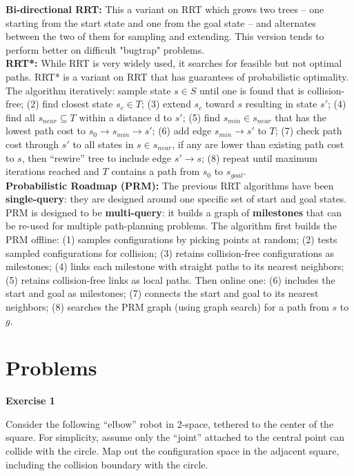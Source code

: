 \documentclass[11pt]{article}
\begin{document}
{\bf{Bi-directional RRT:}} This a variant on RRT which grows two trees -- one starting from the start state and one from the goal state -- and alternates between the two of them for sampling and extending. This version tends to perform better on difficult "bugtrap" problems. \\

{\bf{RRT*:}} While RRT is very widely used, it searches for feasible but not optimal paths. RRT* is a variant on RRT that has guarantees of probabilistic optimality. The algorithm iteratively: sample state $s \in S$ until one is found that is collision-free; (2) find closest state $s_c \in T$; (3) extend $s_c$ toward $s$ resulting in state $s'$; (4) find all $s_{near} \subseteq T$ within a distance d to $s'$; (5) find $s_{min} \in s_{near}$ that has the lowest path cost to $s_0 \rightarrow s_{min} \rightarrow s'$; (6) add edge $s_{min} \rightarrow s'$ to $T$; (7) check path cost through $s'$ to all states in $s \in s_{near}$, if any are lower than existing path cost to $s$, then ``rewire'' tree to include edge $s' \rightarrow s$; (8) repeat until maximum iterations reached and $T$ contains a path from $s_0$ to $s_{goal}$. \\

{\bf{Probabilistic Roadmap (PRM):}} The previous RRT algorithms have been {\bf{single-query}}: they are designed around one specific set of start and goal states. PRM is designed to be {\bf{multi-query}}: it builds a graph of {\bf{milestones}} that can be re-used for multiple path-planning problems. The algorithm first builds the PRM offline: (1) samples configurations by picking points at random; (2) tests sampled configurations for collision; (3) retains collision-free configurations as milestones; (4) links each milestone with straight paths to its nearest neighbors; (5) retains collision-free links as local paths. Then online one: (6) includes the start and goal as milestones; (7) connects the start and goal to its nearest neighbors; (8) searches the PRM graph (using graph search) for a path from $s$ to $g$.



\section{Problems}

{\bf{Exercise 1}}

Consider the following ``elbow'' robot in 2-space, tethered
to the center of the square.
For simplicity, assume only the ``joint'' attached to the central
point can collide with the circle. Map out the configuration space in
the adjacent square, including the collision boundary
with the circle.
\end{document}
